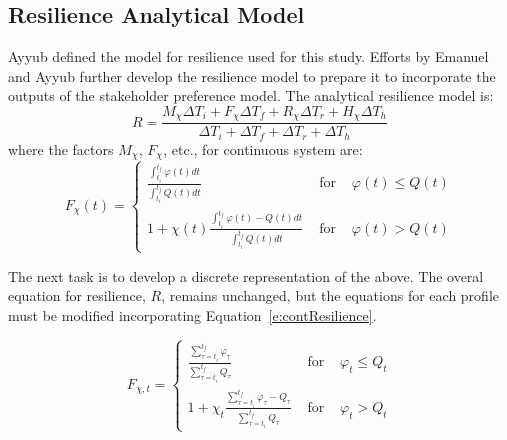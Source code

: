 \documentclass[preprint,12pt]{elsarticle}
\begin{document}
% 
% 

\subsection{Resilience Analytical Model}


Ayyub \cite{Ayyub2014a} defined the model for resilience used for
this study. Efforts by Emanuel and Ayyub
\cite{Emanuel2017,Emanuel2018} further develop the resilience model
to prepare it to incorporate the outputs of the stakeholder preference
model. The analytical resilience model is:
\begin{equation}
  \label{e:contResilience}
    R = \frac{M_{\chi} \Delta T_i + F_{\chi} \Delta T_f + R_{\chi}
    \Delta T_r + H_{\chi} \Delta T_h}
  {\Delta T_i + \Delta T_f + \Delta T_r + \Delta T_h}
\end{equation}
where the factors $M_{\chi}$, $F_{\chi}$, etc., for continuous system are:
\begin{equation}
  \label{e:RPC}
  F_{\chi}(t) = \left\{\begin{array}{lcr}
      \frac{\displaystyle\int_{t_i}^{t_f}\varphi(t)dt}{\displaystyle\int_{t_i}^{t_f}Q(t)dt}
      & \text{ for } & \varphi(t) \leq Q(t) \\
      1 + \chi(t)
      \frac{\displaystyle\int_{t_i}^{t_f}\varphi(t)-Q(t)dt}{\displaystyle\int_{t_i}^{t_f}Q(t)dt}
      & \text{ for } & \varphi(t) > Q(t)
      \end{array}\right.
\end{equation}

The next task is to develop a discrete representation of the
above. The overal equation for resilience, $R$, remains unchanged, but
the equations for each profile must be modified incorporating
Equation~\ref{e:contResilience}.

\begin{equation}
% 
% 
  \label{e:RPD}
  F_{\chi,t} = \left\{\begin{array}{lcr}
    \frac{\displaystyle\sum_{\tau=t_{i}}^{t_f}\varphi_{\tau}}{\displaystyle\sum_{\tau=t_i}^{t_f}Q_{\tau}}
    & \text{ for } &
    \varphi_{t} \leq Q_t \\
      1 + \chi_t
      \frac{\displaystyle\sum_{\tau = t_i}^{t_f}\varphi_{\tau}-Q_{\tau}}{\displaystyle\sum_{\tau = t_i}^{t_f}Q_{\tau}}
      & \text{ for } &
      \varphi_{t} > Q_{t}
  \end{array}\right.
\end{equation}
\end{document}
